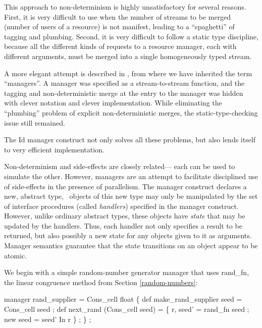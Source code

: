 This approach to non-determinism is highly unsatisfactory for several
reasons. First, it is very difficult to use when the number of streams
to be merged (number of users of a resource) is not manifest, leading
to a ``spaghetti'' of tagging and plumbing.  Second, it is very
difficult to follow a static type discipline, because all the
different kinds of requests to a resource manager, each with different
arguments, must be merged into a single homogeneously typed stream.

A more elegant attempt is described in \cite{Arvind84}, from where we
have inherited the term ``managers''.  A manager was specified as a
stream-to-stream function, and the tagging and non-deterministic merge
at the entry to the manager was hidden with clever notation and clever
implementation.  While eliminating the ``plumbing'' problem of
explicit non-deterministic merges, the static-type-checking issue
still remained.

The Id {\cf manager} construct not only solves all these problems, but
also lends itself to very efficient implementation.

Non-determinism and side-effects are closely related--- each can be
used to simulate the other.  However, managers are an attempt to
facilitate disciplined use of side-effects in the presence of
parallelism.  The {\cf manager} construct declares a new, abstract
type, \ie\ objects of this new type may only be manipulated by the set
of interface procedures (called {\em handlers\/}) specified in the
manager construct.  However, unlike ordinary abstract types, these
objects have {\em state\/} that may be updated by the handlers.  Thus,
each handler not only specifies a result to be returned, but also
possibly a new state for any objects given to it as arguments.
Manager semantics guarantee that the state transitions on an object
appear to be atomic.

We begin with a simple random-number generator manager that uses {\cf
rand\_fn}, the linear congruence method from Section
\ref{random-numbers}:

\begin{minipage}{\textwidth}
\begin{idenv}
manager rand\_supplier = Cons\_cell float
\{
    def make\_rand\_supplier seed = Cons\_cell seed ;
\null
    def next\_rand (Cons\_cell seed) = \{ r, seed' = rand\_fn seed ;
                                       new seed = seed'
                                     In
                                       r \} ;
\} ;
\end{idenv}
\end{minipage}

